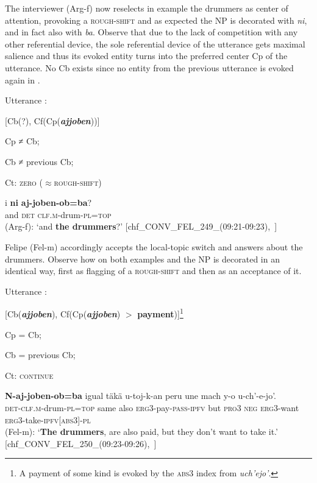 \documentclass[output=paper
,modfonts
,nonflat]{langsci/langscibook}
\begin{document}
The interviewer (Arg-f) now reselects in example  the drummers as center of attention, provoking a \textsc{rough-shift} and as expected the NP is decorated with \textit{ni}, and in fact also with \textit{ba}. Observe that due to the lack of competition with any other referential device, the sole referential device of the utterance gets maximal salience and thus its evoked entity turns into the preferred center Cp of the utterance. No Cb exists since no entity from the previous utterance  is evoked again in .\newpage

\ea
Utterance :

[Cb(?), Cf(Cp(\textbf{\textit{ajjoben}}))]

Cp ≠ Cb;

Cb ≠ previous Cb;

Ct: \textsc{zero ($\approx$rough-shift)}
\z


\ea{}
\label{ex:pico:43}

\gll i \textbf{ni} \textbf{aj-joben-ob=ba}?
\\
and {\textsc{det}} {\textsc{clf.m}}-drum-{\textsc{pl}}={\textsc{top}}\\
\glt (Arg-f): `and \textbf{the drummers}?' [chf\_CONV\_FEL\_249\_(09:21-09:23),~\citealt{Delgado-Galvan2018archive}]
\z

Felipe (Fel-m) accordingly accepts the local-topic switch and answers about the drummers. Observe how on both examples  and  the NP is decorated in an identical way, first as flagging of a \textsc{rough-shift} and then as an acceptance of it. 

\ea
Utterance :

[Cb(\textbf{\textit{ajjoben}}), Cf(Cp(\textbf{\textit{ajjoben}}) $>$ \textbf{payment})]\footnote{A payment of some kind is evoked by the \textsc{abs3} index from \textit{uch'ejo'}.}

Cp = Cb;

Cb = previous Cb;

Ct: \textsc{continue}
\z


\ea{}
\label{ex:pico:45}

\gll \textbf{N-aj-joben-ob=ba} igual t\"ak\"a u-toj-k-an peru une mach y-o u-ch'-e-jo'.
\\
{\textsc{det}}-{\textsc{clf.m}}-drum-{\textsc{pl}}={\textsc{top}} same also {\textsc{erg3}}-pay-{\textsc{pass}}-{\textsc{ipfv}} but {\textsc{pro3}} {\textsc{neg}} {\textsc{erg3}}-want {\textsc{erg3}}-take-{\textsc{ipfv[abs3]}}-{\textsc{pl}}\\
\glt (Fel-m): `\textbf{The drummers}, are also paid, but they don't want to take it.' [chf\_CONV\_FEL\_250\_(09:23-09:26),~\citealt{Delgado-Galvan2018archive}]
\z
\end{document}
